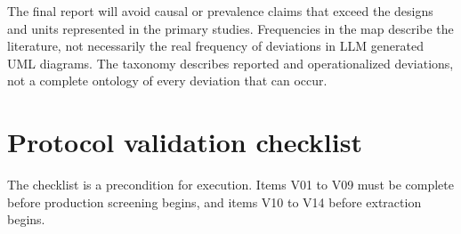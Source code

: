 The final report will avoid causal or prevalence claims that exceed the designs and units represented in the primary studies. Frequencies in the map describe the literature, not necessarily the real frequency of deviations in LLM generated UML diagrams. The taxonomy describes reported and operationalized deviations, not a complete ontology of every deviation that can occur.

\section{Protocol validation checklist}
\label{sec:protocol_checklist}

The checklist is a precondition for execution. Items V01 to V09 must be complete before production screening begins, and items V10 to V14 before extraction begins.

